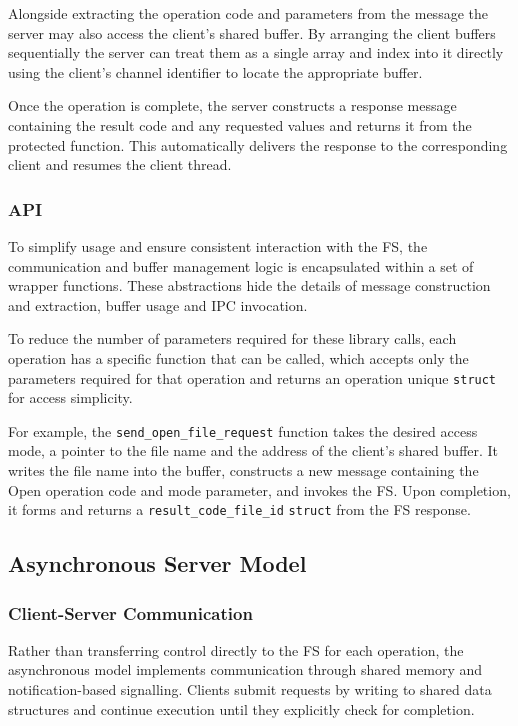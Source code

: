 Alongside extracting the operation code and parameters from the message the server may also access the client’s shared buffer. By arranging the client buffers sequentially the server can treat them as a single array and index into it directly using the client’s channel identifier to locate the appropriate buffer. 

Once the operation is complete, the server constructs a response message containing the result code and any requested values and returns it from the protected function. This automatically delivers the response to the corresponding client and resumes the client thread. 

\subsubsection{API}

To simplify usage and ensure consistent interaction with the FS, the communication and buffer management logic is encapsulated within a set of wrapper functions. These abstractions hide the details of message construction and extraction, buffer usage and IPC invocation. 

To reduce the number of parameters required for these library calls, each operation has a specific function that can be called, which accepts only the parameters required for that operation and returns an operation unique \texttt{struct} for access simplicity.

For example, the \texttt{send\_open\_file\_request} function takes the desired access mode, a pointer to the file name and the address of the client’s shared buffer. It writes the file name into the buffer, constructs a new message containing the Open operation code and mode parameter, and invokes the FS. Upon completion, it forms and returns a \texttt{result\_code\_file\_id} \texttt{struct} from the FS response.

\subsection{Asynchronous Server Model}

\subsubsection{Client-Server Communication}

Rather than transferring control directly to the FS for each operation, the asynchronous model implements communication through shared memory and notification-based signalling. Clients submit requests by writing to shared data structures and continue execution until they explicitly check for completion. 

